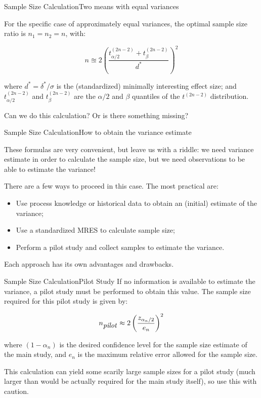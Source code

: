 \begin{frame}{Sample Size Calculation}{Two means with equal variances}

For the specific case of approximately equal variances, the optimal sample size ratio is $n_1 = n_2 = n$, with:

\begin{equation*}
n \approxeq 2\left(\frac{t^{(2n-2)}_{\alpha/2}+t^{(2n-2)}_{\beta}}{d^*}\right)^2
\end{equation*}

where $d^* = \delta^*/\sigma$ is the (standardized) minimally interesting effect size; and $t^{(2n-2)}_{\alpha/2}$ and $t^{(2n-2)}_{\beta}$ are the $\alpha/2$ and $\beta$ quantiles of the $t^{(2n-2 )}$ distribution.\bigskip

Can we do this calculation? Or is there something missing?

\end{frame}

\begin{frame}{Sample Size Calculation}{How to obtain the variance estimate}

These formulas are very convenient, but leave us with a riddle: we need variance estimate in order to calculate the sample size, but we need observations to be able to estimate the variance!\bigskip

There are a few ways to proceed in this case. The most practical are:

\begin{itemize}
  \item Use process knowledge or historical data to obtain an (initial) estimate of the variance;
  \item Use a standardized MRES to calculate sample size;
  \item Perform a pilot study and collect samples to estimate the variance.
\end{itemize}\bigskip

Each approach has its own advantages and drawbacks.
\end{frame}

\begin{frame}{Sample Size Calculation}{Pilot Study}
If no information is available to estimate the variance, a pilot study must be performed to obtain this value. The sample size required for this pilot study is given by:

\begin{equation*}
n_{\mbox{\textit{pilot}}}\approx 2\left(\frac{z_{\alpha_n/2}}{e_{n}}\right)^2
\end{equation*}

\noindent where $(1-\alpha_{n})$ is the desired confidence level for the sample size estimate of the main study, and $e_n$ is the maximum relative error allowed for the sample size.\bigskip

This calculation can yield some scarily large sample sizes for a pilot study (much larger than would be actually required for the main study itself), so use this with caution.
\end{frame}



